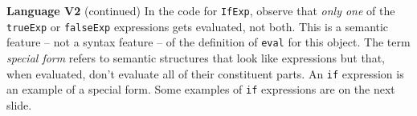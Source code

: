 \begin{minipage}[t]{\sw}
\slidenumber
\LARGE
{\bf Language V2} (continued)\exx
\Large
{}\exx
\LARGE
In the code for \verb'IfExp',
observe that {\em only one}
of the \verb'trueExp' or \verb'falseExp' expressions
gets evaluated, not both.
This is a semantic feature -- not a syntax feature --
of the definition of \verb'eval' for this object.
The term {\em special form} refers
to semantic structures that look like expressions
but that, when evaluated, don't evaluate all of their constituent parts.
An \verb'if' expression is an example of a special form.\exx
Some examples of \verb'if' expressions are on the next slide.
\end{minipage}
